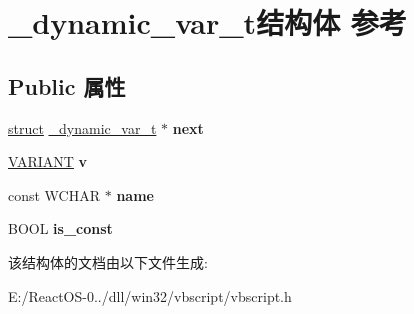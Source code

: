 \hypertarget{struct__dynamic__var__t}{}\section{\+\_\+dynamic\+\_\+var\+\_\+t结构体 参考}
\label{struct__dynamic__var__t}
\subsection*{Public 属性}
\begin{DoxyCompactItemize}
\item 
\mbox{\label{struct__dynamic__var__t_ac2de6ed7a19c640f38b354e424786398}} 
\hyperlink{interfacestruct}{struct} \hyperlink{struct__dynamic__var__t}{\+\_\+dynamic\+\_\+var\+\_\+t} $\ast$ {\bfseries next}
\item 
\mbox{\label{struct__dynamic__var__t_a3ac04006de08ffc59aa097737c8e737c}} 
\hyperlink{structtag_v_a_r_i_a_n_t}{V\+A\+R\+I\+A\+NT} {\bfseries v}
\item 
\mbox{\label{struct__dynamic__var__t_ab177ee453804438e9b8970d50b44562b}} 
const W\+C\+H\+AR $\ast$ {\bfseries name}
\item 
\mbox{\label{struct__dynamic__var__t_a834181f227422390a0e9571e111c6744}} 
B\+O\+OL {\bfseries is\+\_\+const}
\end{DoxyCompactItemize}


该结构体的文档由以下文件生成\+:\begin{DoxyCompactItemize}
\item 
E\+:/\+React\+O\+S-\/0../dll/win32/vbscript/vbscript.\+h\end{DoxyCompactItemize}
